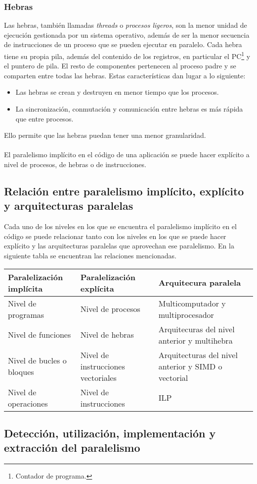 \documentclass[11pt,twoside,titlepage,a4paper]{article}
\begin{document}
\subsubsection*{Hebras}
Las hebras, también llamadas \textit{threads} o \textit{procesos ligeros}, son la menor unidad de ejecución
gestionada por un sistema operativo, además de ser la menor secuencia de instrucciones de un proceso que
se pueden ejecutar en paralelo. Cada hebra tiene su propia pila, además del contenido de los registros, en
particular el PC\footnote{Contador de programa.} y el puntero de pila. El resto de componentes pertenecen
al proceso padre y se comparten entre todas las hebras. Estas características dan lugar a lo siguiente:
\begin{itemize}[noitemsep]
	\item Las hebras se crean y destruyen en menor tiempo que los procesos.
	\item La sincronización, conmutación y comunicación entre hebras es más rápida que entre procesos.
\end{itemize}
Ello permite que las hebras puedan tener una menor granularidad.
\\\\El paralelismo implícito en el código de una aplicación se puede hacer explícito a nivel de procesos,
de hebras o de instrucciones.

\subsection{Relación entre paralelismo implícito, explícito y arquitecturas paralelas}

Cada uno de los niveles en los que se encuentra el paralelismo implícito en el código se puede relacionar
tanto con los niveles en los que se puede hacer explícito y las arquitecturas paralelas que aprovechan ese
paralelismo. En la siguiente tabla se encuentran las relaciones mencionadas.

\begin{center}\begin{tabular}{|l| p{5cm} | p{5.5cm} |}
	\hline
	\textbf{Paralelización implícita} & \textbf{Paralelización explícita} & \textbf{Arquitecura paralela} 
	\\ \hline
	Nivel de programas & Nivel de procesos & Multicomputador y multiprocesador\\ \hline
	Nivel de funciones & Nivel de hebras & Arquitecuras del nivel anterior y multihebra \\ \hline
	Nivel de bucles o bloques & Nivel de instrucciones vectoriales & Arquitecturas del nivel anterior y 
	SIMD o vectorial \\ \hline
	Nivel de operaciones & Nivel de instrucciones & ILP \\
	\hline
\end{tabular}\end{center}

\subsection{Detección, utilización, implementación y extracción del paralelismo}
\end{document}
